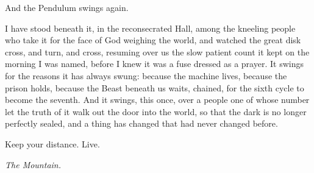 And the Pendulum swings again.\par

I have stood beneath it, in the reconsecrated Hall, among the kneeling people who take it for the face of God weighing the world, and watched the great disk cross, and turn, and cross, resuming over us the slow patient count it kept on the morning I was named, before I knew it was a fuse dressed as a prayer. It swings for the reasons it has always swung: because the machine lives, because the prison holds, because the Beast beneath us waits, chained, for the sixth cycle to become the seventh. And it swings, this once, over a people one of whose number let the truth of it walk out the door into the world, so that the dark is no longer perfectly sealed, and a thing has changed that had never changed before.\par

Keep your distance. Live.\par

\emph{The Mountain.}\par
